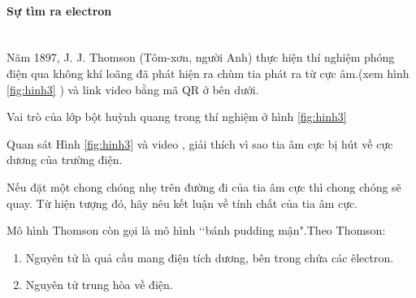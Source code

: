 \paragraph{Sự tìm ra electron}
\\
Năm 1897, J. J. Thomson (Tôm-xơn, người Anh) thực hiện thí nghiệm phóng điện qua không khí loãng đã phát hiện ra chùm tia phát ra từ cực âm.(xem hình \ref{fig:hinh3} ) và link video bằng mã QR ở bên dưới.\\ 






\begin{hoivadap}
	Vai trò của lớp bột huỳnh quang trong thí nghiệm ở hình \ref{fig:hinh3}
\end{hoivadap}

\begin{hoivadap}
	Quan sát Hình \ref{fig:hinh3} và video , giải thích vì sao tia âm cực bị hút về cực dương của trường điện.
\end{hoivadap}

\begin{hoivadap}
	Nếu đặt một chong chóng nhẹ trên đường đi của tia âm cực thì chong chóng sẽ quay. Từ hiện tượng đó, hãy nêu kết luận về tính chất của tia âm cực.
\end{hoivadap}
\newpage
\vspace*{6pt}
\begin{emcobiet}
	Mô hình Thomson còn gọi là mô hình \lq\lq bánh pudding mận".Theo Thomson:
	\begin{enumerate}
		\item Nguyên tử là quả cầu mang điện tích dương, bên trong chứa các êlectron.
		\item Nguyên tử trung hòa về điện.
	\end{enumerate}
	
\end{emcobiet}


